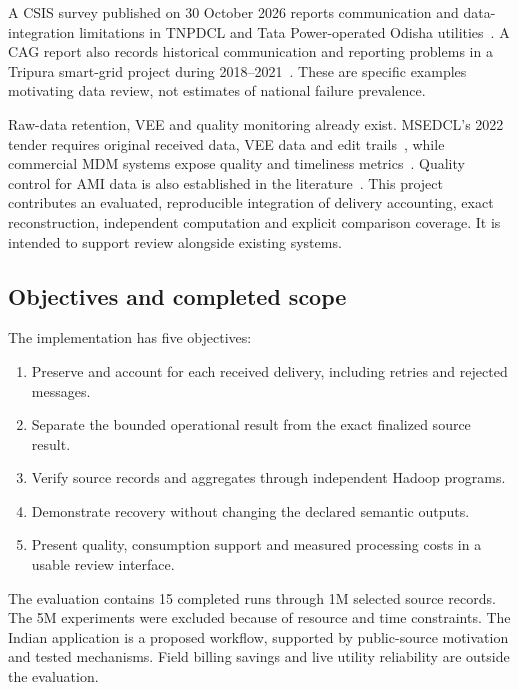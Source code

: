 \documentclass[11pt,a4paper]{article}
\begin{document}
A CSIS survey published on 30 October 2026 reports communication and data-integration limitations in TNPDCL and Tata Power-operated Odisha utilities~\cite{csis}. A CAG report also records historical communication and reporting problems in a Tripura smart-grid project during 2018--2021~\cite{cag}. These are specific examples motivating data review, not estimates of national failure prevalence.

Raw-data retention, VEE and quality monitoring already exist. MSEDCL's 2022 tender requires original received data, VEE data and edit trails~\cite{msedcl}, while commercial MDM systems expose quality and timeliness metrics~\cite{oracle}. Quality control for AMI data is also established in the literature~\cite{garrison}. This project contributes an evaluated, reproducible integration of delivery accounting, exact reconstruction, independent computation and explicit comparison coverage. It is intended to support review alongside existing systems.

\subsection{Objectives and completed scope}
The implementation has five objectives:
\begin{enumerate}
\item Preserve and account for each received delivery, including retries and rejected messages.
\item Separate the bounded operational result from the exact finalized source result.
\item Verify source records and aggregates through independent Hadoop programs.
\item Demonstrate recovery without changing the declared semantic outputs.
\item Present quality, consumption support and measured processing costs in a usable review interface.
\end{enumerate}
The evaluation contains 15 completed runs through 1M selected source records. The 5M experiments were excluded because of resource and time constraints. The Indian application is a proposed workflow, supported by public-source motivation and tested mechanisms. Field billing savings and live utility reliability are outside the evaluation.



\FloatBarrier
\end{document}
